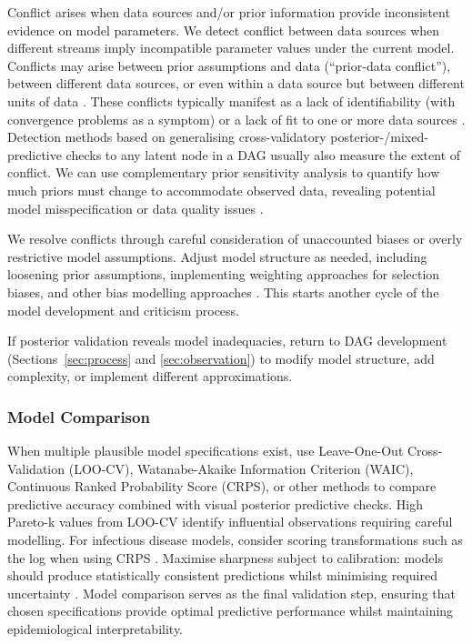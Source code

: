 \documentclass{article}
\begin{document}
Conflict arises when data sources and/or prior information provide inconsistent evidence on model parameters.
We detect conflict between data sources when different streams imply incompatible parameter values under the current model.
Conflicts may arise between prior assumptions and data (``prior-data conflict''), between different data sources, or even within a data source but between different units of data \citep{presanis2013conflict,yang2025detecting}.
These conflicts typically manifest as a lack of identifiability (with convergence problems as a symptom) or a lack of fit to one or more data sources \citep{presanis2013conflict,deangelis2018analysing}. Detection methods based on generalising cross-validatory posterior-/mixed-predictive checks to any latent node in a DAG \citep{presanis2013conflict,yang2025detecting} usually also measure the extent of conflict. We can use complementary  prior sensitivity analysis to quantify how much priors must change to accommodate observed data, revealing potential model misspecification or data quality issues \citep{Roos2015,Kallioinen2024,yang2025detecting}.

We resolve conflicts through careful consideration of unaccounted biases or overly restrictive model assumptions.
Adjust model structure as needed, including loosening prior assumptions, implementing weighting approaches for selection biases, and other bias modelling approaches \citep{deangelis2018analysing}.
This starts another cycle of the model development and criticism process.

If posterior validation reveals model inadequacies, return to DAG development (Sections~\ref{sec:process} and \ref{sec:observation}) to modify model structure, add complexity, or implement different approximations.

\subsubsection{Model Comparison}

When multiple plausible model specifications exist, use Leave-One-Out Cross-Validation (LOO-CV), Watanabe-Akaike Information Criterion (WAIC), Continuous Ranked Probability Score (CRPS), or other methods to compare predictive accuracy \citep{vehtari2017practical,yao2018using,gneiting2007strictly} combined with visual posterior predictive checks.
High Pareto-k values from LOO-CV identify influential observations requiring careful modelling.
For infectious disease models, consider scoring transformations such as the log when using CRPS \citep{bosse2023scoring}.
Maximise sharpness subject to calibration: models should produce statistically consistent predictions whilst minimising required uncertainty \citep{gneiting2007strictly}.
Model comparison serves as the final validation step, ensuring that chosen specifications provide optimal predictive performance whilst maintaining epidemiological interpretability.
\end{document}
